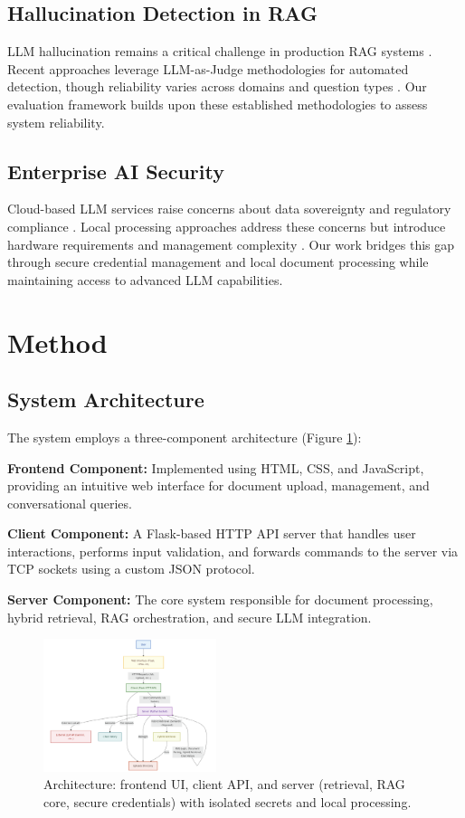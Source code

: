 \documentclass[11pt]{article}
\begin{document}
\subsection{Hallucination Detection in RAG}
LLM hallucination remains a critical challenge in production RAG systems \cite{hallucination_survey}. Recent approaches leverage LLM-as-Judge methodologies for automated detection, though reliability varies across domains and question types \cite{llm_judge}. Our evaluation framework builds upon these established methodologies to assess system reliability.

\subsection{Enterprise AI Security}
Cloud-based LLM services raise concerns about data sovereignty and regulatory compliance \cite{privacyinternational,edpb}. Local processing approaches address these concerns but introduce hardware requirements and management complexity \cite{anthropicmcp}. Our work bridges this gap through secure credential management and local document processing while maintaining access to advanced LLM capabilities.

\section{Method}

\subsection{System Architecture}

The system employs a three-component architecture (Figure \ref{fig:architecture}):

\textbf{Frontend Component:} Implemented using HTML, CSS, and JavaScript, providing an intuitive web interface for document upload, management, and conversational queries.

\textbf{Client Component:} A Flask-based HTTP API server that handles user interactions, performs input validation, and forwards commands to the server via TCP sockets using a custom JSON protocol.

\textbf{Server Component:} The core system responsible for document processing, hybrid retrieval, RAG orchestration, and secure LLM integration.

\begin{figure}[htbp]
\centering
\begingroup
\captionsetup{font=small}
\includegraphics[width=0.45\textwidth]{images/architecture_simple_diagram.png}
\caption{Architecture: frontend UI, client API, and server (retrieval, RAG core, secure credentials) with isolated secrets and local processing.}
\label{fig:architecture}
\endgroup
\end{figure}
\end{document}
